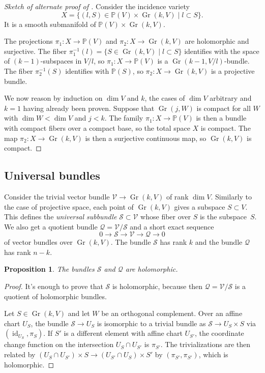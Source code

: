 \documentclass[11pt]{article}
\newtheorem{prop}[theo]{Proposition}
\newtheorem*{proof}{Proof}
\newcommand{\kk}[1]{\mathbb{#1}}
\newcommand{\cc}[1]{\mathcal{#1}}
\DeclareMathOperator{\Gr}{Gr}
\DeclareMathOperator{\id}{id}
\begin{document}
\begin{proof}[Sketch of alternate proof of ]
Consider the incidence variety
$$
X = \{
(l, S) \in \kk P(V) \times \Gr(k, V)
\mid
l \subset S
\}.
$$
It is a smooth submanifold of $\kk P(V) \times \Gr(k, V)$.

The projections $\pi_1 : X \to \kk P(V)$ and $\pi_2 : X \to \Gr(k, V)$ are holomorphic and surjective. The fiber $\pi_1^{-1}(l) = \{ S \in \Gr(k,V) \mid l \subset S \}$ identifies with the space of $(k-1)$-subspaces in $V / l$, so $\pi_1 : X \to \kk P(V)$ is a $\Gr(k-1,V/l)$-bundle. The fiber $\pi_2^{-1}(S)$ identifies with $\kk P(S)$, so $\pi_2 : X \to \Gr(k, V)$ is a projective bundle.

We now reason by induction on $\dim V$ and $k$, the cases of $\dim V$ arbitrary and $k = 1$ having already been proven. Suppose that $\Gr(j, W)$ is compact for all $W$ with $\dim W < \dim V$ and $j < k$. The family $\pi_1 : X \to \kk P(V)$ is then a bundle with compact fibers over a compact base, so the total space $X$ is compact. The map $\pi_2 : X \to \Gr(k,V)$ is then a surjective continuous map, so $\Gr(k,V)$ is compact.
\end{proof}



\subsection{Universal bundles}

Consider the trivial vector bundle $\cc V \to \Gr(k,V)$ of rank $\dim V$. Similarly to the case of projective space, each point of $\Gr(k,V)$ gives a subspace $S \subset V$. This defines the \emph{universal subbundle} $\cc S \subset \cc V$ whose fiber over $S$ is the subspace~$S$. We also get a quotient bundle $\cc Q = \cc V/\cc S$ and a short exact sequence
$$
0 \to \cc S \to \cc V \to \cc Q \to 0
$$
of vector bundles over $\Gr(k,V)$. The bundle $\cc S$ has rank $k$ and the bundle $\cc Q$ has rank $n-k$.


\begin{prop}
The bundles $\cc S$ and $\cc Q$ are holomorphic.
\end{prop}

\begin{proof}
  It's enough to prove that $\cc S$ is holomorphic, because then $\cc Q = \cc V/\cc S$ is a quotient of holomorphic bundles.

  Let $S \in \Gr(k, V)$ and let $W$ be an orthogonal complement. Over an affine chart $U_S$, the bundle $\cc S \to U_S$ is isomorphic to a trivial bundle as $\cc S \to U_S \times S$ via $(\id_{U_S}, \pi_S)$. If $S'$ is a different element with affine chart $U_{S'}$, the coordinate change function on the intersection $U_S \cap U_{S'}$ is $\pi_{S'}$. The trivializations are then related by $(U_S \cap U_{S'}) \times S \to (U_{S'} \cap U_S) \times S'$ by $(\pi_{S'}, \pi_{S'})$, which is holomorphic.
\end{proof}
\end{document}
